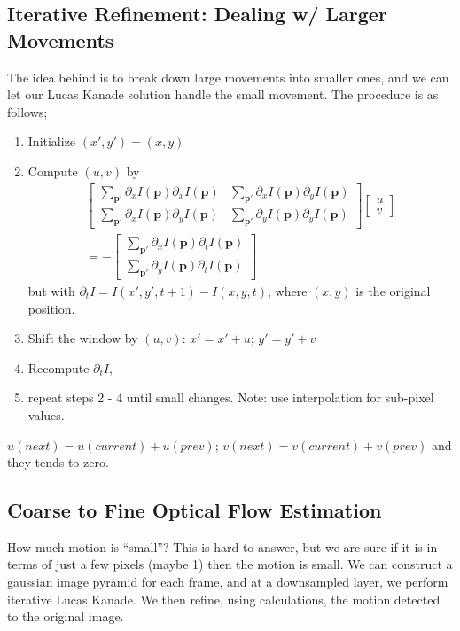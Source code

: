 \documentclass[11pt]{article}
\newcommand{\bp}{\mathbf{p}}
\begin{document}
\subsection{Iterative Refinement: Dealing w/ Larger Movements}
The idea behind is to break down large movements into smaller ones, and we can let our Lucas Kanade solution handle the small movement. The procedure is as follows;
\begin{enumerate}
	\item Initialize $(x', y') = (x, y)$
	\item Compute $(u, v)$ by
		\begin{multline}
			\left[\begin{array}{cc}
				\sum_{\bp '} \partial_x I(\bp) \partial_x I(\bp) & \sum_{\bp '} \partial_x I(\bp) \partial_y I(\bp) \\
				\sum_{\bp '} \partial_x I(\bp) \partial_y I(\bp) & \sum_{\bp '} \partial_y I(\bp) \partial_y I(\bp)
				\end{array}\right]\left[\begin{array}{l}
				u \\
				v
				\end{array}\right] \\ =-\left[\begin{array}{c}
				\sum_{\bp '} \partial_x I(\bp) \partial_t I(\bp) \\
				\sum_{\bp '} \partial_y I(\bp) \partial_t I(\bp)
			\end{array}\right]
		\end{multline}
		but with $\partial_t I = I(x', y' , t + 1) - I(x, y, t)$, where $(x, y)$ is the original position. 
	\item Shift the window by $(u, v)$: $x' = x' + u$; $y' = y' + v$
	\item Recompute $\partial_t I$,
	\item repeat steps 2 - 4 until small changes. Note: use interpolation for sub-pixel values. 
\end{enumerate}
$u(next) = u(current) + u(prev); \, v(next) = v(current) + v(prev)$ and they tends to zero. 

\subsection{Coarse to Fine Optical Flow Estimation}
How much motion is ``small''? This is hard to answer, but we are sure if it is in terms of just a few pixels (maybe 1) then the motion is small. We can construct a gaussian image pyramid for each frame, and at a downsampled layer, we perform iterative Lucas Kanade. We then refine, using calculations, the motion detected to the original image. 
\end{document}
